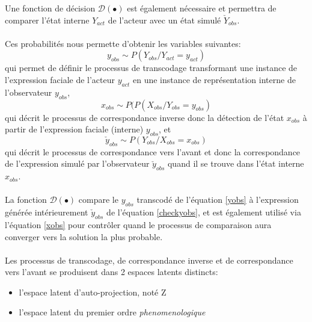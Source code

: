 \documentclass[poster]{polytech/polytech}
\begin{document}
Une fonction de décision $\mathcal{D}(\bullet )$ est également nécessaire et permettra de comparer l'état interne $Y_{act}$ de l'acteur avec un état simulé $\check{Y}_{obs}$.\\
\\
Ces probabilités nous permette d'obtenir les variables suivantes:
\begin{equation}
y_{obs}\sim P(Y_{obs}/Y_{act}= y_{act})
\label{yobs}
\end{equation}
qui permet de définir le processus de transcodage transformant une instance de l'expression faciale de l'acteur $y_{act}$ en une instance de représentation interne de l'observateur $y_{obs}$,
\begin{equation}
x_{obs}\sim P(P(X_{obs}/Y_{obs}= y_{obs})
\label{xobs}
\end{equation}
qui décrit le processus de correspondance inverse donc la détection de l'état $x_{obs}$ à partir de l'expression faciale (interne) $y_{obs}$, et
\begin{equation}
\check{y}_{obs}\sim P(Y_{obs}/X_{obs}= x_{obs})
\label{checkyobs}
\end{equation}
qui décrit le processus de correspondance vers l'avant et donc la correspondance de l'expression simulé par l'observateur $\check{y}_{obs}$ quand il se trouve dans l'état interne $x_{obs}$.\\
\\
La fonction $\mathcal{D}(\bullet )$ compare le $y_{obs}$ transcodé de l'équation \eqref{yobs} à l'expression générée intérieurement $\check{y}_{obs}$ de l'équation \eqref{checkyobs}, et est également utilisé via l'équation \eqref{xobs} pour contrôler quand le processus de comparaison aura converger vers la solution la plus probable.\\
\\
Les processus de transcodage, de correspondance inverse et de correspondance vers l'avant se produisent dans 2 espaces latents distincts:
\begin{itemize}
\item l'espace latent d'auto-projection, noté Z
\item l'espace latent du premier ordre \textit{phenomenologique}\\
\end{itemize}
\end{document}
